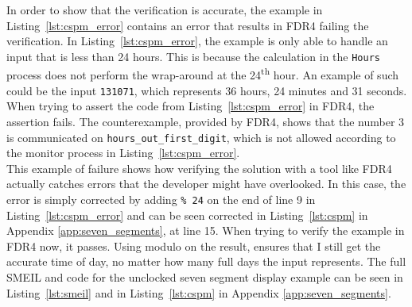 In order to show that the verification is accurate, the example in Listing~\ref{lst:cspm_error} contains an error that results in FDR4 failing the verification. In Listing~\ref{lst:cspm_error}, the example is only able to handle an input that is less than 24 hours. This is because the calculation in the \texttt{Hours} process does not perform the wrap-around at the 24\textsuperscript{th} hour. An example of such could be the input \texttt{131071}, which represents 36 hours, 24 minutes and 31 seconds. When trying to assert the code from Listing~\ref{lst:cspm_error} in FDR4, the assertion fails. The counterexample, provided by FDR4, shows that the number 3 is communicated on \texttt{hours\_out\_first\_digit}, which is not allowed according to the monitor process in Listing~\ref{lst:cspm_error}.\\

This example of failure shows how verifying the solution with a tool like FDR4 actually catches errors that the developer might have overlooked. In this case, the error is simply corrected by adding \texttt{\% 24} on the end of line 9 in Listing~\ref{lst:cspm_error} and can be seen corrected in Listing~\ref{lst:cspm} in Appendix \ref{app:seven_segments}, at line 15. When trying to verify the example in FDR4 now, it passes. Using modulo on the result, ensures that I still get the accurate time of day, no matter how many full days the input represents.
The full SMEIL and \cspm{} code for the unclocked seven segment display example can be seen in Listing~\ref{lst:smeil} and in Listing~\ref{lst:cspm} in Appendix \ref{app:seven_segments}.

